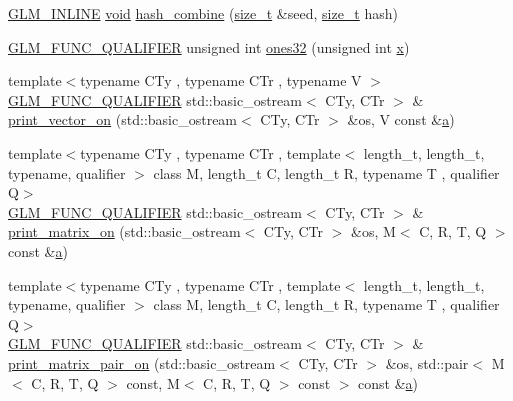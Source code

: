 \begin{DoxyCompactItemize}
\item 
\mbox{\hyperlink{setup_8hpp_a4603970cbd724c5d102bbcf17f430047}{G\+L\+M\+\_\+\+I\+N\+L\+I\+NE}} \mbox{\hyperlink{_s_d_l__opengles2__gl2ext_8h_ae5d8fa23ad07c48bb609509eae494c95}{void}} \mbox{\hyperlink{namespaceglm_1_1detail_a391b3eb8d7f4662a1b31046bd69f2755}{hash\+\_\+combine}} (\mbox{\hyperlink{_s_d_l__config__winrt_8h_a7c94ea6f8948649f8d181ae55911eeaf}{size\+\_\+t}} \&seed, \mbox{\hyperlink{_s_d_l__config__winrt_8h_a7c94ea6f8948649f8d181ae55911eeaf}{size\+\_\+t}} hash)
\item 
\mbox{\hyperlink{setup_8hpp_a33fdea6f91c5f834105f7415e2a64407}{G\+L\+M\+\_\+\+F\+U\+N\+C\+\_\+\+Q\+U\+A\+L\+I\+F\+I\+ER}} unsigned int \mbox{\hyperlink{namespaceglm_1_1detail_a2699e3b3ea6ad8d4bb99aed56761582c}{ones32}} (unsigned int \mbox{\hyperlink{_s_d_l__opengl_8h_ad0e63d0edcdbd3d79554076bf309fd47}{x}})
\item 
{\footnotesize template$<$typename C\+Ty , typename C\+Tr , typename V $>$ }\\\mbox{\hyperlink{setup_8hpp_a33fdea6f91c5f834105f7415e2a64407}{G\+L\+M\+\_\+\+F\+U\+N\+C\+\_\+\+Q\+U\+A\+L\+I\+F\+I\+ER}} std\+::basic\+\_\+ostream$<$ C\+Ty, C\+Tr $>$ \& \mbox{\hyperlink{namespaceglm_1_1detail_a9d760c8d2e4e01ac441fcbba7d387055}{print\+\_\+vector\+\_\+on}} (std\+::basic\+\_\+ostream$<$ C\+Ty, C\+Tr $>$ \&os, V const \&\mbox{\hyperlink{_s_d_l__opengl__glext_8h_a3309789fc188587d666cda5ece79cf82}{a}})
\item 
{\footnotesize template$<$typename C\+Ty , typename C\+Tr , template$<$ length\+\_\+t, length\+\_\+t, typename, qualifier $>$ class M, length\+\_\+t C, length\+\_\+t R, typename T , qualifier Q$>$ }\\\mbox{\hyperlink{setup_8hpp_a33fdea6f91c5f834105f7415e2a64407}{G\+L\+M\+\_\+\+F\+U\+N\+C\+\_\+\+Q\+U\+A\+L\+I\+F\+I\+ER}} std\+::basic\+\_\+ostream$<$ C\+Ty, C\+Tr $>$ \& \mbox{\hyperlink{namespaceglm_1_1detail_a45b170ea667900227c6849ad1dfe1bf5}{print\+\_\+matrix\+\_\+on}} (std\+::basic\+\_\+ostream$<$ C\+Ty, C\+Tr $>$ \&os, M$<$ C, R, T, Q $>$ const \&\mbox{\hyperlink{_s_d_l__opengl__glext_8h_a3309789fc188587d666cda5ece79cf82}{a}})
\item 
{\footnotesize template$<$typename C\+Ty , typename C\+Tr , template$<$ length\+\_\+t, length\+\_\+t, typename, qualifier $>$ class M, length\+\_\+t C, length\+\_\+t R, typename T , qualifier Q$>$ }\\\mbox{\hyperlink{setup_8hpp_a33fdea6f91c5f834105f7415e2a64407}{G\+L\+M\+\_\+\+F\+U\+N\+C\+\_\+\+Q\+U\+A\+L\+I\+F\+I\+ER}} std\+::basic\+\_\+ostream$<$ C\+Ty, C\+Tr $>$ \& \mbox{\hyperlink{namespaceglm_1_1detail_a5b82ceb67c3495960b07267d105170c5}{print\+\_\+matrix\+\_\+pair\+\_\+on}} (std\+::basic\+\_\+ostream$<$ C\+Ty, C\+Tr $>$ \&os, std\+::pair$<$ M$<$ C, R, T, Q $>$ const, M$<$ C, R, T, Q $>$ const $>$ const \&\mbox{\hyperlink{_s_d_l__opengl__glext_8h_a3309789fc188587d666cda5ece79cf82}{a}})

\end{DoxyCompactItemize}
